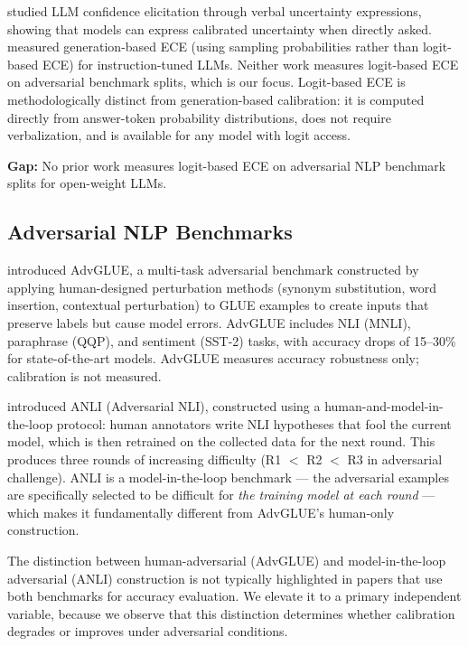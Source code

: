 \citet{xiong2023can} studied LLM confidence elicitation through verbal uncertainty expressions, showing that models can express calibrated uncertainty when directly asked. \citet{zhao2023calibrating} measured generation-based ECE (using sampling probabilities rather than logit-based ECE) for instruction-tuned LLMs. Neither work measures logit-based ECE on adversarial benchmark splits, which is our focus. Logit-based ECE is methodologically distinct from generation-based calibration: it is computed directly from answer-token probability distributions, does not require verbalization, and is available for any model with logit access.

\textbf{Gap:} No prior work measures logit-based ECE on adversarial NLP benchmark splits for open-weight LLMs.

\subsection{Adversarial NLP Benchmarks}

\citet{wang2021adversarial} introduced AdvGLUE, a multi-task adversarial benchmark constructed by applying human-designed perturbation methods (synonym substitution, word insertion, contextual perturbation) to GLUE examples to create inputs that preserve labels but cause model errors. AdvGLUE includes NLI (MNLI), paraphrase (QQP), and sentiment (SST-2) tasks, with accuracy drops of 15--30\% for state-of-the-art models. AdvGLUE measures accuracy robustness only; calibration is not measured.

\citet{nie2020adversarial} introduced ANLI (Adversarial NLI), constructed using a human-and-model-in-the-loop protocol: human annotators write NLI hypotheses that fool the current model, which is then retrained on the collected data for the next round. This produces three rounds of increasing difficulty (R1 $<$ R2 $<$ R3 in adversarial challenge). ANLI is a model-in-the-loop benchmark --- the adversarial examples are specifically selected to be difficult for \textit{the training model at each round} --- which makes it fundamentally different from AdvGLUE's human-only construction.

The distinction between human-adversarial (AdvGLUE) and model-in-the-loop adversarial (ANLI) construction is not typically highlighted in papers that use both benchmarks for accuracy evaluation. We elevate it to a primary independent variable, because we observe that this distinction determines whether calibration degrades or improves under adversarial conditions.

